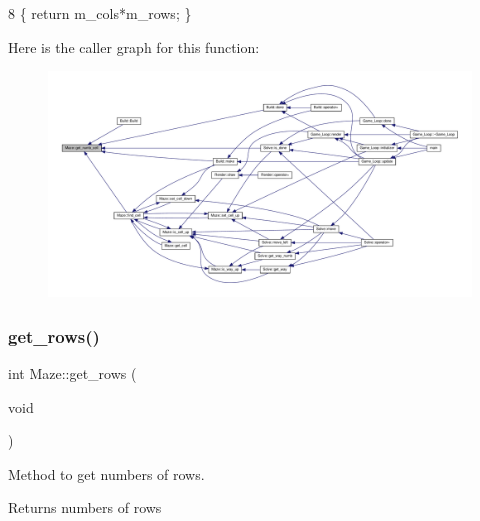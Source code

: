 \begin{DoxyCode}
8 \{ \textcolor{keywordflow}{return} m\_cols*m\_rows; \}
\end{DoxyCode}
Here is the caller graph for this function\+:\nopagebreak
\begin{figure}[H]
\begin{center}
\leavevmode
\includegraphics[width=350pt]{classMaze_a90f5c1c140a9991942204d4a7fec3bf8_icgraph}
\end{center}
\end{figure}
\mbox{\label{classMaze_ac786606a34632b2254b2d27d5f5f0f3f}} 
\subsubsection{\texorpdfstring{get\+\_\+rows()}{get\_rows()}}
{\footnotesize\ttfamily int Maze\+::get\+\_\+rows (\begin{DoxyParamCaption}\item[{void}]{ }\end{DoxyParamCaption})}



Method to get numbers of rows. 

\begin{DoxyReturn}{Returns}
numbers of rows 
\end{DoxyReturn}

